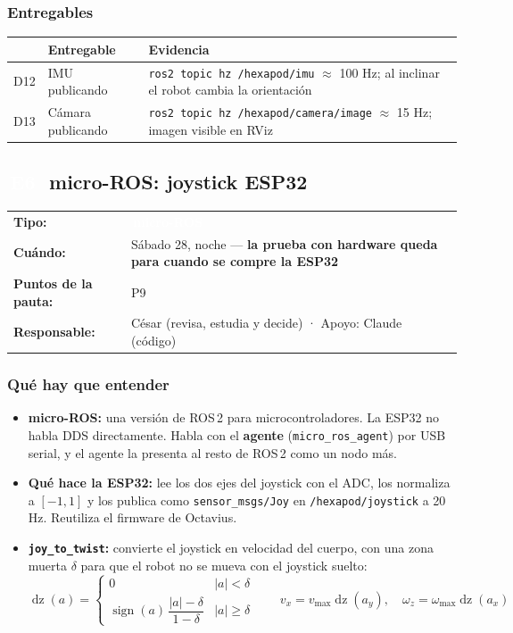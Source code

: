 \documentclass[11pt,a4paper]{article}
\makeatletter
\newcommand{\pill}[2]{{\setlength{\fboxsep}{1.6pt}\colorbox{#1}{\textcolor{white}{\footnotesize\bfseries\,#2\,}}}}
\newcommand{\Es}{\pill{cMicro}{E6}}
\newcommand{\ficha}[4]{%
  \begin{tabularx}{\linewidth}{@{}l Y@{}}
  \textbf{Tipo:} & \pill{#1}{#2}\\
  \textbf{Cuándo:} & #3\\
  \textbf{Puntos de la pauta:} & #4\\
  \textbf{Responsable:} & César (revisa, estudia y decide) · Apoyo: Claude (código)\\
  \end{tabularx}\par}
\makeatother
\begin{document}
\subsubsection{Entregables}
\begin{tabularx}{\linewidth}{@{}l Y Y@{}}
\toprule \textbf{} & \textbf{Entregable} & \textbf{Evidencia}\\ \midrule
D12 & IMU publicando & \texttt{ros2 topic hz /hexapod/imu} $\approx$ 100 Hz; al inclinar el robot cambia la orientación\\
D13 & Cámara publicando & \texttt{ros2 topic hz /hexapod/camera/image} $\approx$ 15 Hz; imagen visible en RViz\\
\bottomrule
\end{tabularx}

\subsection{\texorpdfstring{\Es\ }{E6 }micro-ROS: joystick ESP32}
\ficha{cMicro}{micro-ROS}{Sábado 28, noche --- \textbf{la prueba con hardware queda para cuando se compre la ESP32}}{P9}

\subsubsection{Qué hay que entender}
\begin{itemize}
  \item \textbf{micro-ROS:} una versión de ROS\,2 para microcontroladores. La ESP32 no habla DDS directamente. Habla con el \textbf{agente} (\texttt{micro\_ros\_agent}) por USB serial, y el agente la presenta al resto de ROS\,2 como un nodo más.
  \item \textbf{Qué hace la ESP32:} lee los dos ejes del joystick con el ADC, los normaliza a $[-1, 1]$ y los publica como \texttt{sensor\_msgs/Joy} en \texttt{/hexapod/joystick} a 20 Hz. Reutiliza el firmware de Octavius.
  \item \textbf{\texttt{joy\_to\_twist}:} convierte el joystick en velocidad del cuerpo, con una zona muerta $\delta$ para que el robot no se mueva con el joystick suelto:
  \begin{equation}
  \operatorname{dz}(a) = \begin{cases}0 & |a| < \delta\\ \operatorname{sign}(a)\,\dfrac{|a|-\delta}{1-\delta} & |a| \geq \delta\end{cases}\qquad v_x = v_{\max}\operatorname{dz}(a_y),\quad \omega_z = \omega_{\max}\operatorname{dz}(a_x)
  \end{equation}
\end{itemize}
\end{document}
